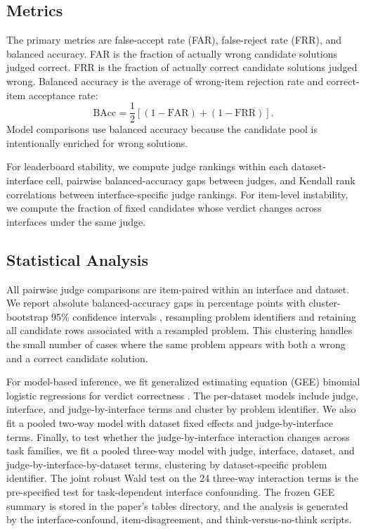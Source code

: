 \documentclass[journal]{IEEEtran}
\newcommand{\far}{\mathrm{FAR}}
\begin{document}
\subsection{Metrics}
\label{sec:metrics}

The primary metrics are false-accept rate (FAR), false-reject rate (FRR), and balanced accuracy. FAR is the fraction of actually wrong candidate solutions judged correct. FRR is the fraction of actually correct candidate solutions judged wrong. Balanced accuracy is the average of wrong-item rejection rate and correct-item acceptance rate:
\begin{equation}
\mathrm{BAcc} = \frac{1}{2}\left[(1-\far) + (1-\mathrm{FRR})\right].
\end{equation}
Model comparisons use balanced accuracy because the candidate pool is intentionally enriched for wrong solutions.

For leaderboard stability, we compute judge rankings within each dataset-interface cell, pairwise balanced-accuracy gaps between judges, and Kendall rank correlations between interface-specific judge rankings. For item-level instability, we compute the fraction of fixed candidates whose verdict changes across interfaces under the same judge.

\subsection{Statistical Analysis}
\label{sec:stats}

All pairwise judge comparisons are item-paired within an interface and dataset. We report absolute balanced-accuracy gaps in percentage points with cluster-bootstrap 95\% confidence intervals \citep{efron1993bootstrap}, resampling problem identifiers and retaining all candidate rows associated with a resampled problem. This clustering handles the small number of cases where the same problem appears with both a wrong and a correct candidate solution.

For model-based inference, we fit generalized estimating equation (GEE) binomial logistic regressions for verdict correctness \citep{liang1986longitudinal}. The per-dataset models include judge, interface, and judge-by-interface terms and cluster by problem identifier. We also fit a pooled two-way model with dataset fixed effects and judge-by-interface terms. Finally, to test whether the judge-by-interface interaction changes across task families, we fit a pooled three-way model with judge, interface, dataset, and judge-by-interface-by-dataset terms, clustering by dataset-specific problem identifier. The joint robust Wald test on the 24 three-way interaction terms is the pre-specified test for task-dependent interface confounding. The frozen GEE summary is stored in the paper's tables directory, and the analysis is generated by the interface-confound, item-disagreement, and think-versus-no-think scripts.
\end{document}
